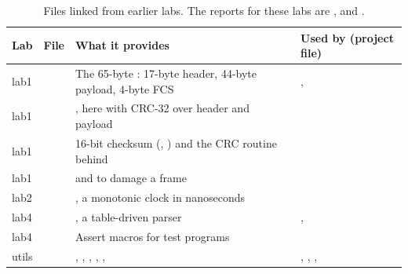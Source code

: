\begin{table}[H]
\centering
\footnotesize
\caption{Files linked from earlier labs. The reports for these labs are \cite{lab1}, \cite{lab2} and \cite{lab4}.}
\label{tab:d-reuse}
\begin{tabularx}{\linewidth}{@{}l l Y l@{}}
\toprule
Lab & File & What it provides & Used by (project file) \\
\midrule
lab1 &  & The 65-byte : 17-byte header, 44-byte payload, 4-byte FCS & ,  \\
lab1 &  & , here with CRC-32 over header and payload &  \\
lab1 &  & 16-bit checksum (, ) and the CRC routine behind  &  \\
lab1 &  &  and  to damage a frame &  \\
lab2 &  & , a monotonic clock in nanoseconds &  \\
lab4 &  & , a table-driven  parser & ,  \\
lab4 &  & Assert macros for test programs &  \\
utils &  & , , , , ,  & , , ,  \\
\bottomrule
\end{tabularx}
\end{table}
